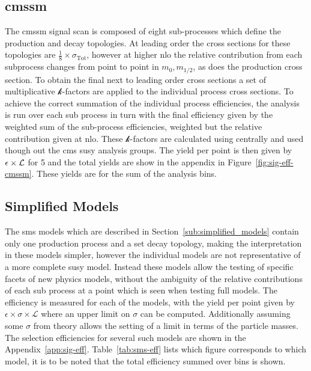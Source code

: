 \subsection{\ac{cmssm}} %
\label{par:cmssm}
The \ac{cmssm} signal scan is composed of eight sub-processes which define the 
production and decay topologies. At leading order the cross sections for these topologies are $\frac{1}{8}\times\sigma_{\mathrm{Tot}}$, however at higher \ac{nlo} the relative contribution from each subprocess changes from point to point in $m_{0}, m_{1/2}$, as does the production cross section. To obtain the final next to leading order cross sections a set of multiplicative $\mathcal{k}$-factors are applied to the individual process cross sections. To achieve the correct summation of the individual process efficiencies, the  analysis is run over each sub process in turn with the final 
efficiency given by the weighted sum of the sub-process efficiencies, weighted but the relative contribution given at \ac{nlo}. These $\mathcal{k}$-factors are calculated using centrally and used though out the \ac{cms} \ac{susy} analysis groups. The yield  per point is then given by $\epsilon\time\sigma\times\mathcal{L}$ for \unit{5}{\invfb} and the total yields are show in the appendix in Figure~\ref{fig:sig-eff-cmssm}. These yields are for the sum of the \HT analysis bins.

\subsection{Simplified Models} %
\label{par:simplified_models}
The \ac{sms} models which are described in Section~\ref{sub:simplified_models} contain only one production process and a set decay topology, making the interpretation in these models simpler, however the individual models are not representative of a more complete \ac{susy} model.
Instead these models allow the testing of specific facets of new physics 
models, without the ambiguity of the relative contributions of each sub 
process at a point which is seen when testing full models. The efficiency is 
measured for each of the models, with the yield per point given by 
$\epsilon\times\sigma\times\mathcal{L}$ where an upper limit on $\sigma$ can be 
computed. Additionally assuming some $\sigma$ from theory allows the setting of 
a limit in terms of the particle masses. The selection efficiencies for several 
such models are shown in the Appendix~\ref{app:sig-eff}. 
Table~\ref{tab:sms-eff} lists which figure corresponds to which model, it is to 
be noted that the total efficiency summed over \HT bins is shown.



